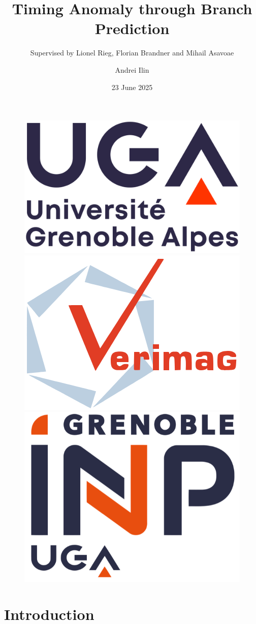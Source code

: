 \documentclass{beamer}
\author{Andrei Ilin}
\title{Timing Anomaly through Branch Prediction}
\subtitle{Supervised by Lionel Rieg, Florian Brandner and Mihail Asavoae}
\institute{Université Grenoble Alpes}
\date{23 June 2025}
\begin{document}


\renewcommand{\figurename}{Fig.}

\begin{frame}
    \titlepage
    \begin{figure}[htpb]
        \begin{center}
            \includegraphics[width=0.2\linewidth]{pic/logo-uga.png}\hspace{1.5cm}
            \includegraphics[width=0.2\linewidth]{pic/logo-verimag.png}\hspace{1.5cm}
            \includegraphics[width=0.2\linewidth]{pic/logo-INP.png}
        \end{center}
    \end{figure}
\end{frame}

\begin{frame}
    \tableofcontents[sectionstyle=show,subsectionstyle=show/shaded/hide,subsubsectionstyle=show/shaded/hide]
\end{frame}

\section{Introduction}
\end{document}
